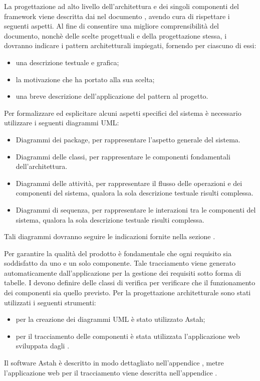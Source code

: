 La progettazione ad alto livello dell'architettura e dei singoli componenti del framework \projectname{} viene descritta dai  nel documento , avendo cura di rispettare i seguenti aspetti.
Al fine di consentire una migliore comprensibilità del documento, nonchè delle scelte progettuali e della progettazione stessa, i  dovranno indicare i pattern architetturali impiegati, fornendo per ciascuno di essi:
\begin{itemize}
\item una descrizione testuale e grafica;
\item la motivazione che ha portato alla sua scelta;
\item una breve descrizione dell'applicazione del pattern al progetto.
\end{itemize}
Per formalizzare ed esplicitare alcuni aspetti specifici del sistema è necessario utilizzare i seguenti diagrammi UML:
\begin{itemize}
\item Diagrammi dei package, per rappresentare l'aspetto generale del sistema.
\item Diagrammi delle classi, per rappresentare le componenti fondamentali dell'architettura.
\item Diagrammi delle attività, per rappresentare il flusso delle operazioni e dei componenti del sistema, qualora la sola descrizione testuale risulti complessa.
\item Diagrammi di sequenza, per rappresentare le interazioni tra le componenti del sistema, qualora la sola descrizione testuale risulti complessa.
\end{itemize}
Tali diagrammi dovranno seguire le indicazioni fornite nella sezione .
				
Per garantire la qualità del prodotto è fondamentale che ogni requisito sia soddisfatto da uno e un solo componente. Tale tracciamento viene generato automaticamente dall'applicazione per la gestione dei requisiti sotto forma di tabelle.
I  devono definire delle classi di verifica per verificare che il funzionamento dei componenti sia quello previsto.
Per la progettazione architetturale sono stati utilizzati i seguenti strumenti:
\begin{itemize}
\item per la creazione dei diagrammi UML è stato utilizzato Astah;
\item per il tracciamento delle componenti è stata utilizzata l'applicazione web sviluppata dagli .
\end{itemize}
Il software Astah è descritto in modo dettagliato nell'appendice , metre l'applicazione web per il tracciamento viene descritta nell'appendice .


